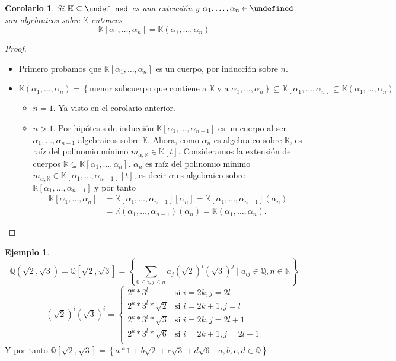 \documentclass[10pt, spanish]{report}
\newtheorem*{cor}{Corolario}
\theoremstyle{definition}
\newtheorem*{ej}{Ejemplo}
\newcommand{\N}{\mathbb{N}}
\newcommand{\Q}{\mathbb{Q}}
\newcommand{\K}{\mathbb{K}}
\let\L\undefined
\newcommand{\L}{\mathbb{L}}
\renewcommand{\leq}{\leqslant}
\begin{document}
\begin{cor}
    Si $\K\subseteq\L$ es una extensión y $\alpha_1,\ldots,\alpha_n\in\L$ son
    algebraicos sobre $\K$ entonces \[\K[\alpha_1,\ldots,\alpha_n]=
    \K(\alpha_1,\ldots,\alpha_n)\]
\end{cor}

\begin{proof}\hspace{0pt}
    \begin{itemize}
        \item Primero probamos que $\K[\alpha_1,\ldots,\alpha_n]$ es un cuerpo, por
    inducción sobre $n$.
    \item $\K(\alpha_1,\ldots,\alpha_n)=\left\{\text{menor subcuerpo que contiene a } \K \text{ y a } \alpha_1,\ldots,\alpha_n\right\}\subseteq\K[\alpha_1,\ldots,\alpha_n]\subseteq
    \K(\alpha_1,\ldots,\alpha_n)$
    \begin{itemize}
        \item $n=1$. Ya visto en el corolario anterior.
        \item $n>1$. Por hipótesis de inducción
            $\K[\alpha_1,\ldots,\alpha_{n-1}]$ es un cuerpo al ser
            $\alpha_1,\ldots,\alpha_{n-1}$ algebraicos sobre $\K$. Ahora, como
            $\alpha_n$ es algebraico sobre $\K$, es raíz del polinomio mínimo
            $m_{\alpha,\K}\in \K[t]$. Consideramos la extensión de cuerpos
            $\K\subseteq\K[\alpha_1,\ldots,\alpha_n]$. $\alpha_n$ es raíz del
            polinomio mínimo $m_{\alpha,\K}\in
            \K[\alpha_1,\ldots,\alpha_{n-1}][t]$, es decir $\alpha$ es
            algebraico sobre $\K[\alpha_1,\ldots,\alpha_{n-1}]$ y por tanto
            \begin{align*}
                \K[\alpha_1,\ldots,\alpha_{n}]
                &=\K[\alpha_1,\ldots,\alpha_{n-1}][\alpha_n]
                =\K[\alpha_1,\ldots,\alpha_{n-1}](\alpha_n)\\
                &=\K(\alpha_1,\ldots,\alpha_{n-1})(\alpha_n)
                =\K(\alpha_1,\ldots,\alpha_n).
            \end{align*}
    \end{itemize}\vspace{-1em}
    \end{itemize}
\end{proof}

\begin{ej}
    \[\Q(\sqrt{2},\sqrt{3})=\Q[\sqrt{2},\sqrt{3}]=\left\{ \sum_{0\leq
    i,j\leq n} a_j(\sqrt{2})^i(\sqrt{3})^j\mid a_{ij}\in\Q,n\in\N\right\}\]
    \[(\sqrt{2})^i(\sqrt{3})^i=\begin{cases}
        2^k*3^l &\text{si } i=2k, j=2l\\
        2^k*3^l*\sqrt{2}&\text{si } i=2k+1,j=l\\
        2^k*3^l*\sqrt{3}&\text{si } i=2k,j=2l+1\\
        2^k*3^l*\sqrt{6}&\text{si } i=2k+1,j=2l+1\\
    \end{cases}\]
    Y por tanto $\Q[\sqrt{2},\sqrt{3}]=\left\{
    a*1+b\sqrt{2}+c\sqrt{3}+d\sqrt{6}\mid a,b,c,d\in \Q    \right\} $
\end{ej}
\end{document}

